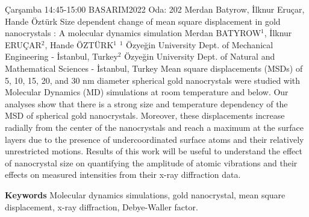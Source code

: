 
    \begin{abstract_basarim}
    {Çarşamba 14:45-15:00}
    {BASARIM2022}
    {Oda: 202}
    {Merdan Batyrow, İlknur Eruçar, Hande Öztürk}
    {Size dependent change of mean square displacement in gold nanocrystals : A molecular dynamics simulation}
    {%
    Merdan BATYROW$^{1}$, İlknur ERUÇAR$^{2}$, Hande ÖZTÜRK$^{1}$}
    {%
    }
    {%
    $^1$ Özyeğin University Dept. of Mechanical Engineering - İstanbul, Turkey\newline{}$^2$ Özyeğin University Dept. of Natural and Mathematical Sciences - İstanbul, Turkey}
    Mean square displacements (MSDs) of 5, 10, 15, 20, and 30 nm diameter spherical gold nanocrystals were studied with Molecular Dynamics (MD) simulations at room temperature and below. Our analyses show that there is a strong size and temperature dependency of the MSD of spherical gold nanocrystals. Moreover, these displacements increase radially from the center of the nanocrystals and reach a maximum at the surface layers due to the presence of undercoordinated surface atoms and their relatively unrestricted motions. Results of this work will be useful to understand the effect of nanocrystal size on quantifying the amplitude of atomic vibrations and their effects on measured intensities from their x-ray diffraction data. 
    
        \textbf{Keywords} \newline{}Molecular dynamics simulations, gold nanocrystal, mean square displacement, x-ray diffraction, Debye-Waller factor.
    \end{abstract_basarim}
    
